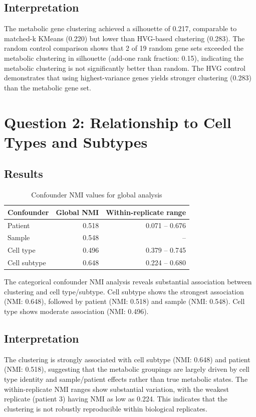 \documentclass[11pt]{article}
\begin{document}
\subsection{Interpretation}

The metabolic gene clustering achieved a silhouette of 0.217, comparable to matched-k KMeans (0.220) but lower than HVG-based clustering (0.283). The random control comparison shows that 2 of 19 random gene sets exceeded the metabolic clustering in silhouette (add-one rank fraction: 0.15), indicating the metabolic clustering is not significantly better than random. The HVG control demonstrates that using highest-variance genes yields stronger clustering (0.283) than the metabolic gene set.

\section{Question 2: Relationship to Cell Types and Subtypes}

\subsection{Results}

\begin{table}[h!]
\centering
\caption{Confounder NMI values for global analysis}
\label{tab:confounders}
\begin{tabular}{lrr}
\toprule
Confounder & Global NMI & Within-replicate range \\
\midrule
Patient & 0.518 & 0.071 -- 0.676 \\
Sample & 0.548 & -- \\
Cell type & 0.496 & 0.379 -- 0.745 \\
Cell subtype & 0.648 & 0.224 -- 0.680 \\
\bottomrule
\end{tabular}
\end{table}

The categorical confounder NMI analysis reveals substantial association between clustering and cell type/subtype. Cell subtype shows the strongest association (NMI: 0.648), followed by patient (NMI: 0.518) and sample (NMI: 0.548). Cell type shows moderate association (NMI: 0.496).

\subsection{Interpretation}

The clustering is strongly associated with cell subtype (NMI: 0.648) and patient (NMI: 0.518), suggesting that the metabolic groupings are largely driven by cell type identity and sample/patient effects rather than true metabolic states. The within-replicate NMI ranges show substantial variation, with the weakest replicate (patient 3) having NMI as low as 0.224. This indicates that the clustering is not robustly reproducible within biological replicates.
\end{document}
